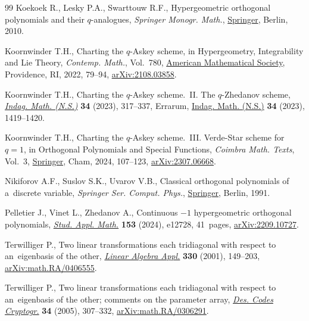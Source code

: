 \documentclass[pdftex]{sigma}
\numberwithin{equation}{section}
\begin{document}
\begin{thebibliography}{99}
Koekoek R., Lesky P.A., Swarttouw R.F., Hypergeometric orthogonal polynomials
 and their {$q$}-analogues, \textit{Springer Monogr. Math.},
 \href{https://doi.org/10.1007/978-3-642-05014-5}{Springer}, Berlin, 2010.

Koornwinder T.H., Charting the {$q$}-{A}skey scheme, in Hypergeometry,
 Integrability and {L}ie Theory, \textit{Contemp. Math.}, Vol.~780,
 \href{https://doi.org/10.1090/conm/780/15688}{American Mathematical Society},
 Providence, RI, 2022, 79--94,
 \href{http://arxiv.org/abs/2108.03858}{arXiv:2108.03858}.

Koornwinder T.H., Charting the {$q$}-{A}skey scheme.~{II}. {T}he
 {$q$}-{Z}hedanov scheme,
 \href{https://doi.org/10.1016/j.indag.2022.12.003}{\textit{Indag. Math.
 (N.S.)}} \textbf{34} (2023), 317--337, {E}rrarum,
 \href{https://doi.org/10.1016/j.indag.2023.05.006}{Indag. Math. (N.S.)}
 \textbf{34} (2023), 1419--1420.

Koornwinder T.H., Charting the {$q$}-{A}skey scheme.~{III}. Verde-Star scheme
 for $q=1$, in Orthogonal Polynomials and Special Functions, \textit{Coimbra Math. Texts}, Vol.~3, 
 \href{https://doi.org/10.1007/978-3-031-69646-6_5}{Springer}, Cham, 2024, 107--123,
 \href{http://arxiv.org/abs/2307.06668}{arXiv:2307.06668}.

Nikiforov A.F., Suslov S.K., Uvarov V.B., Classical orthogonal polynomials of
 a~discrete variable, \textit{Springer Ser. Comput. Phys.},
 \href{https://doi.org/10.1007/978-3-642-74748-9}{Springer}, Berlin, 1991.

Pelletier J., Vinet L., Zhedanov A., Continuous {$-1$} hypergeometric
 orthogonal polynomials,
 \href{https://doi.org/0.1111/sapm.12728}{\textit{Stud. Appl. Math.}}
 \textbf{153} (2024), e12728, 41~pages,
 \href{http://arxiv.org/abs/2209.10727}{arXiv:2209.10727}.

Terwilliger P., Two linear transformations each tridiagonal with respect to
 an~eigenbasis of the other,
 \href{https://doi.org/10.1016/S0024-3795(01)00242-7}{\textit{Linear Algebra
 Appl.}} \textbf{330} (2001), 149--203,
 \href{http://arxiv.org/abs/math.RA/0406555}{arXiv:math.RA/0406555}.

Terwilliger P., Two linear transformations each tridiagonal with respect to
 an~eigenbasis of the other; comments on the parameter array,
 \href{https://doi.org/10.1007/s10623-004-4862-7}{\textit{Des. Codes
 Cryptogr.}} \textbf{34} (2005), 307--332,
 \href{http://arxiv.org/abs/math.RA/0306291}{arXiv:math.RA/0306291}.


\end{thebibliography}
\end{document}
